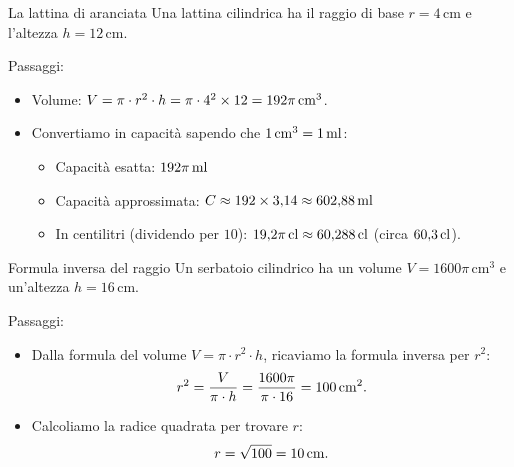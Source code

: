 \begin{esercizio}{La lattina di aranciata}
Una lattina cilindrica ha il raggio di base $r = 4\,\mathrm{cm}$ e l'altezza $h = 12\,\mathrm{cm}$. 


\responsespace{5.5cm}

\begin{soluzione}
  Passaggi:
  \begin{itemize}
    \item Volume: $V = \pi \cdot r^2 \cdot h = \pi \cdot 4^2 \times 12 = 192\pi\,\mathrm{cm^3}$.
    \item Convertiamo in capacità sapendo che $1\,\mathrm{cm^3} = 1\,\mathrm{ml}$:
    \begin{itemize}
      \item Capacità esatta: $192\pi\,\mathrm{ml}$
      \item Capacità approssimata: $C \approx 192 \times 3{,}14 \approx 602{,}88\,\mathrm{ml}$
      \item In centilitri (dividendo per $10$): $19{,}2\pi\,\mathrm{cl} \approx 60{,}288\,\mathrm{cl}$ (circa $60{,}3\,\mathrm{cl}$).
    \end{itemize}
  \end{itemize}
\end{soluzione}
\end{esercizio}

\condnewpage

\begin{esercizio}{Formula inversa del raggio}
Un serbatoio cilindrico ha un volume $V = 1600\pi\,\mathrm{cm^3}$ e un'altezza $h = 16\,\mathrm{cm}$.


\responsespace{5.5cm}

\begin{soluzione}
  Passaggi:
  \begin{itemize}
    \item Dalla formula del volume $V = \pi \cdot r^2 \cdot h$, ricaviamo la formula inversa per $r^2$:
    \[
    r^2 = \frac{V}{\pi \cdot h} = \frac{1600\pi}{\pi \cdot 16} = 100\,\mathrm{cm^2}.
    \]
    \item Calcoliamo la radice quadrata per trovare $r$:
    \[
    r = \sqrt{100} = 10\,\mathrm{cm}.
    \]
  \end{itemize}
\end{soluzione}
\end{esercizio}

